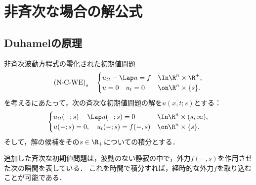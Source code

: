 \documentclass[uplatex,dvipdfmx]{jsreport}
\begin{document}
\section{非斉次な場合の解公式}

\subsection{Duhamelの原理}

\begin{problem}
    非斉次波動方程式の零化された初期値問題
    \[\text{(N-C-WE)}_s\quad\begin{cases}
        u_{tt}-\Lap u=f&\In\R^n\times\R^+,\\
        u=0\quad u_t=0&\on\R^n\times\{s\}.
    \end{cases}\]
    を考えるにあたって，次の斉次な初期値問題の解を$u(x,t;s)$とする：
    \[\begin{cases}
        u_{tt}(-;s)-\Lap u(-;s)=0&\In\R^n\times(s,\infty),\\
        u(-;s)=0,\quad u_t(-;s)=f(-,s)&\on\R^n\times\{s\}.
    \end{cases}\]
    そして，解の候補をその$s\in\R_+$についての積分とする．
\end{problem}
\begin{remarks}[Duhamelの原理の物理的直感]
    追加した斉次な初期値問題は，波動のない静寂の中で，外力$f(-,s)$を作用させた次の瞬間を表している．
    これを時間で積分すれば，経時的な外力$f$を取り込むことが可能である．
\end{remarks}
\end{document}
